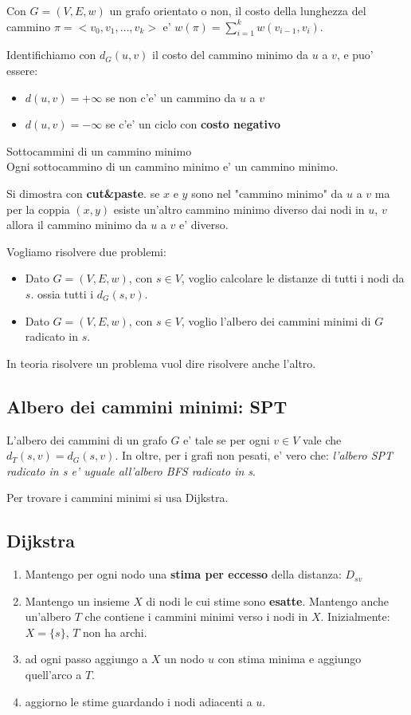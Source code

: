 Con $G=(V,E,w)$ un grafo orientato o non, il  costo della lunghezza del cammino
$\pi = <v_0, v_1, \dots, v_k>$ e' $w(\pi) = \sum_{i=1}^k w(v_{i-1}, v_i)$.

Identifichiamo con $d_G(u,v)$ il costo del cammino minimo da $u$ a $v$, e puo' essere:
\begin{itemize}
    \item $d(u,v)=+\infty$ se non c'e' un cammino da $u$ a $v$
    \item $d(u,v)=-\infty$ se c'e' un ciclo con \textbf{costo negativo}
\end{itemize}

\begin{definition} Sottocammini di un cammino minimo \\
    Ogni sottocammino di un cammino minimo e' un cammino minimo.
\end{definition}

Si dimostra con \textbf{cut\&paste}. se $x$ e $y$ sono nel "cammino minimo" da $u$ a $v$ ma 
per la coppia $(x,y)$ esiste un'altro cammino minimo diverso dai nodi in $u$, $v$ allora il
cammino minimo da $u$ a $v$ e' diverso.

Vogliamo risolvere due problemi: 
\begin{itemize}
    \item Dato $G=(V,E,w)$, con $s \in V$, voglio calcolare le distanze di tutti i nodi da $s$. ossia tutti i $d_G(s,v)$.
    \item Dato $G=(V,E,w)$, con $s \in V$, voglio l'albero dei cammini minimi di $G$ radicato in $s$.
\end{itemize}

In teoria risolvere un problema vuol dire risolvere anche l'altro.

\subsection{Albero dei cammini minimi: SPT}
L'albero dei cammini di un grafo $G$ e' tale se per ogni $v \in V$ vale che $d_T(s,v)=d_G(s,v)$.
In oltre, per i grafi non pesati, e' vero che: \textit{l'albero SPT radicato in s e' uguale all'albero BFS radicato in s}.

Per trovare i cammini minimi si usa Dijkstra.
\subsection{Dijkstra}
\begin{enumerate}
    \item Mantengo per ogni nodo una \textbf{stima per eccesso} della distanza: $D_{sv}$
    \item Mantengo un insieme $X$ di nodi le cui stime sono \textbf{esatte}. Mantengo anche un'albero $T$
    che contiene i cammini minimi verso i nodi in $X$. Inizialmente: $X=\{s\}$, $T$ non ha archi.
    \item ad ogni passo aggiungo a $X$ un nodo $u$ con stima minima e aggiungo quell'arco a $T$.
    \item aggiorno le stime guardando i nodi adiacenti a $u$.
\end{enumerate}

